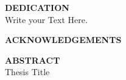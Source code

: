 \begin{titlepage}
\begin{center}
	\vspace{1cm }
	\textbf{\large DEDICATION}\\ \vspace{0.5cm }
	Write your Text Here.
\end{center}
\pagebreak

\begin{center}
	\vspace{1cm }
	\textbf{\large ACKNOWLEDGEMENTS}
\end{center}
\pagebreak

\begin{center}
	\vspace{1cm }
	\textbf{\Large ABSTRACT}\\ \vspace{0.5cm }
	\Large{Thesis Title}
	\normalsize {}
\end{center}
\pagebreak


\renewcommand{\contentsname}{\centering \Large \vspace{-2cm} TABLE OF CONTENTS \vspace{-0.8cm}}  
\tableofcontents

\renewcommand{\listfigurename}{ \Large \vspace{-2cm} \underline{LIST OF FIGURES \hspace{11em}} \vspace{-0.8cm}}
\listoffigures


\renewcommand{\listtablename}{ \Large \vspace{-2cm} \underline{LIST OF TABLES \hspace{11em}\vspace{-0.8cm} } }
\listoftables


\end{titlepage}
